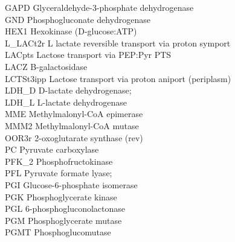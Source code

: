 GAPD \hspace{.5em} Glyceraldehyde-3-phosphate dehydrogenase \\ 
GND \hspace{.5em} Phosphogluconate dehydrogenase \\
HEX1 \hspace{.5em} Hexokinase (D-glucose:ATP) \\
L\_LACt2r \hspace{.5em} L lactate reversible transport via proton symport \\
LACpts \hspace{.5em}  Lactose transport via PEP:Pyr PTS \\
LACZ \hspace{.5em} B-galactosidase \\
LCTSt3ipp \hspace{.5em} Lactose transport via proton aniport (periplasm) \\
LDH\_D \hspace{.5em} D-lactate dehydrogenase; \\
LDH\_L \hspace{.5em} L-lactate dehydrogenase \\
MME \hspace{.5em} Methylmalonyl-CoA epimerase \\
MMM2 \hspace{.5em} Methylmalonyl-CoA mutase \\
OOR3r \hspace{.5em} 2-oxoglutarate synthase (rev) \\
PC \hspace{.5em} Pyruvate carboxylase \\
PFK\_2 \hspace{.5em} Phosphofructokinase \\
PFL \hspace{.5em} Pyruvate formate lyase; \\
PGI \hspace{.5em} Glucose-6-phosphate isomerase \\
PGK \hspace{.5em} Phosphoglycerate kinase \\
PGL \hspace{.5em} 6-phosphogluconolactonase \\
PGM \hspace{.5em} Phosphoglycerate mutase \\
PGMT \hspace{.5em} Phosphoglucomutase \\
